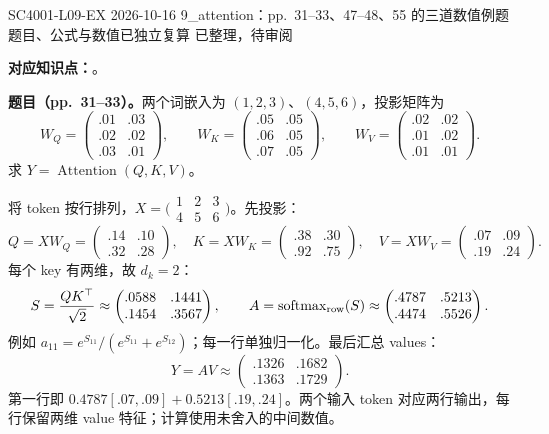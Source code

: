 

\examplemeta
  {SC4001-L09-EX}
  {2026-10-16}
  {9\_attention：pp.~31--33、47--48、55 的三道数值例题}
  {题目、公式与数值已独立复算}
  {已整理，待审阅}


\textbf{对应知识点：}。

\textbf{题目（pp.~31--33）。}两个词嵌入为 $(1,2,3)$、$(4,5,6)$，投影矩阵为
\[
 W_Q=\begin{pmatrix}.01&.03\\.02&.02\\.03&.01\end{pmatrix},\qquad
 W_K=\begin{pmatrix}.05&.05\\.06&.05\\.07&.05\end{pmatrix},\qquad
 W_V=\begin{pmatrix}.02&.02\\.01&.02\\.01&.01\end{pmatrix}.
\]
求 $Y=\operatorname{Attention}(Q,K,V)$。

\begin{workedsolution}
将 token 按行排列，$X=\bigl(\begin{smallmatrix}1&2&3\\4&5&6\end{smallmatrix}\bigr)$。先投影：
\[
 Q=XW_Q=\begin{pmatrix}.14&.10\\.32&.28\end{pmatrix},\quad
 K=XW_K=\begin{pmatrix}.38&.30\\.92&.75\end{pmatrix},\quad
 V=XW_V=\begin{pmatrix}.07&.09\\.19&.24\end{pmatrix}.
\]
每个 key 有两维，故 $d_k=2$：
\[
 S=\frac{QK^\top}{\sqrt2}
 \approx\begin{pmatrix}.0588&.1441\\.1454&.3567\end{pmatrix},\qquad
 A=\operatorname{softmax}_{\rm row}(S)
 \approx\begin{pmatrix}.4787&.5213\\.4474&.5526\end{pmatrix}.
\]
例如 $a_{11}=e^{S_{11}}/(e^{S_{11}}+e^{S_{12}})$；每一行单独归一化。最后汇总 values：
\[
 \boxed{Y=AV\approx\begin{pmatrix}.1326&.1682\\.1363&.1729\end{pmatrix}}.
\]
第一行即 $0.4787[.07,.09]+0.5213[.19,.24]$。两个输入 token 对应两行输出，每行保留两维 value 特征；计算使用未舍入的中间数值。
\end{workedsolution}

